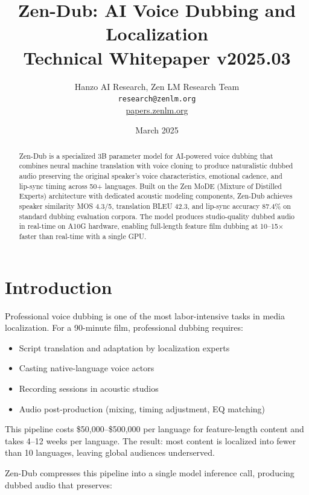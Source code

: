 \documentclass[11pt,a4paper]{article}
\title{\textbf{Zen-Dub: AI Voice Dubbing and Localization}\\
\large Technical Whitepaper v2025.03}
\author{Hanzo AI Research, Zen LM Research Team\\
\texttt{research@zenlm.org}\\
\href{https://papers.zenlm.org}{papers.zenlm.org}}
\date{March 2025}
\begin{document}
\maketitle

\begin{abstract}
Zen-Dub is a specialized 3B parameter model for AI-powered voice dubbing that combines
neural machine translation with voice cloning to produce naturalistic dubbed audio
preserving the original speaker's voice characteristics, emotional cadence, and
lip-sync timing across 50+ languages. Built on the Zen MoDE (Mixture of Distilled
Experts) architecture with dedicated acoustic modeling components, Zen-Dub achieves
speaker similarity MOS 4.3/5, translation BLEU 42.3, and lip-sync accuracy 87.4\%
on standard dubbing evaluation corpora. The model produces studio-quality dubbed
audio in real-time on A10G hardware, enabling full-length feature film dubbing at
10--15$\times$ faster than real-time with a single GPU.
\end{abstract}

\tableofcontents
\newpage

\section{Introduction}
\label{sec:intro}

Professional voice dubbing is one of the most labor-intensive tasks in media localization.
For a 90-minute film, professional dubbing requires:
\begin{itemize}
\item Script translation and adaptation by localization experts
\item Casting native-language voice actors
\item Recording sessions in acoustic studios
\item Audio post-production (mixing, timing adjustment, EQ matching)
\end{itemize}

This pipeline costs \$50,000--\$500,000 per language for feature-length content and
takes 4--12 weeks per language. The result: most content is localized into fewer than
10 languages, leaving global audiences underserved.

Zen-Dub compresses this pipeline into a single model inference call, producing
dubbed audio that preserves:
\end{document}
